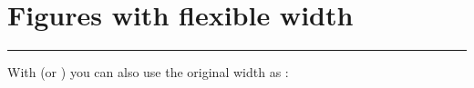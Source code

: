 \usepackage{graphicx}%


\section{Figures with flexible width}

\hrule %



With \texttt{\adjincludegraphics} (or \texttt{\adjustimage}) you can also use the original width as \texttt{\width}:

